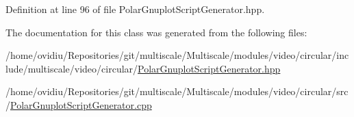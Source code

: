 \-Definition at line 96 of file \-Polar\-Gnuplot\-Script\-Generator.\-hpp.



\-The documentation for this class was generated from the following files\-:\begin{DoxyCompactItemize}
\item 
/home/ovidiu/\-Repositories/git/multiscale/\-Multiscale/modules/video/circular/include/multiscale/video/circular/\hyperlink{PolarGnuplotScriptGenerator_8hpp}{\-Polar\-Gnuplot\-Script\-Generator.\-hpp}\item 
/home/ovidiu/\-Repositories/git/multiscale/\-Multiscale/modules/video/circular/src/\hyperlink{PolarGnuplotScriptGenerator_8cpp}{\-Polar\-Gnuplot\-Script\-Generator.\-cpp}\end{DoxyCompactItemize}
